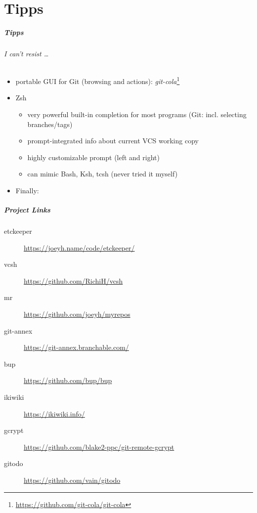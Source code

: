 \documentclass[english,hyperref={pdfpagelabels=false},aspectratio=169]{beamer}
\begin{document}
\part{Tipps}
\makepart

\begin{frame}[label=tipps]
  \frametitle{Tipps}
  \framesubtitle{I can't resist \dots}
  \begin{itemize}
    \item portable GUI for Git {\scriptsize\color{fzjgray50}(browsing and actions)}: \textit{git-cola}\footnote{\tiny\url{https://github.com/git-cola/git-cola}}
    \item Zsh
      \begin{itemize}
        \item very powerful built-in completion for most programs {\scriptsize\color{fzjgray50}(Git: incl. selecting branches/tags)}
        \item prompt-integrated info about current VCS working copy
        \item highly customizable prompt {\scriptsize\color{fzjgray50}(left and right)}
        \item can mimic Bash, Ksh, tcsh {\scriptsize\color{fzjgray50}(never tried it myself)}
      \end{itemize}
    \item Finally:
      \begin{center}
      \end{center}
  \end{itemize}
\end{frame}


\begin{frame}
  \frametitle{Project Links}
  \begin{description}
    \item[etckeeper] \url{https://joeyh.name/code/etckeeper/}
    \item[vcsh] \url{https://github.com/RichiH/vcsh}
    \item[mr] \url{https://github.com/joeyh/myrepos}
    \item[git-annex] \url{https://git-annex.branchable.com/}
    \item[bup] \url{https://github.com/bup/bup}
    \item[ikiwiki] \url{https://ikiwiki.info/}
    \item[gcrypt] \url{https://github.com/blake2-ppc/git-remote-gcrypt}
    \item[gitodo] \url{https://github.com/vain/gitodo}
  \end{description}
\end{frame}
\end{document}
